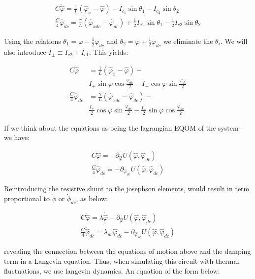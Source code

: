 \documentclass[paper=a4, twocolumn, fontsize=10pt]{article} %
\numberwithin{equation}{section} %
\numberwithin{figure}{section} %
\numberwithin{table}{section} %
\def \df#1{\hat{#1}}
\begin{document}
\begin{align}
    C \ddot{\df\varphi} = \frac{1}{L}\left( \df\varphi_x - \df\varphi \right) - I_{c_1} \sin \theta_1 - I_{c_2} \sin \theta_2
    \\
    \frac{C}{4} \ddot{\df\varphi}_{dc}= \frac{\gamma}{L}\left( \df\varphi_{xdc} -\df\varphi_{dc}\right) +\frac{1}{2}I_{c1} \sin\theta_1 - \frac{1}{2} I_{c2} \sin \theta_2
    \end{align}


Using the relations $\theta_1 = \varphi - \frac{1}{2}\varphi_{dc} $ and $\theta_2 = \varphi + \frac{1}{2}\varphi_{dc} $ we eliminate the $\theta_i$. We will also introduce $I_{\pm} \equiv I_{c2} \pm I_{c1}$.  This yields:

\begin{align}
    C \ddot{\df\varphi} &= \frac{1}{L}\left( \df\varphi_x - \df\varphi \right) - 
    \\
    &I_{+} \sin \varphi \cos \frac{\varphi_{dc}}{2} - I_{-} \cos \varphi \sin \frac{\varphi_{dc}}{2}
    \\
    \frac{C}{4} \ddot{\df\varphi}_{dc} &= \frac{\gamma}{L}\left( \df\varphi_{xdc} -\df\varphi_{dc}\right) - 
    \\
    &\frac{I_{+}}{2} \cos \varphi \sin \frac{\varphi_{dc}}{2} - \frac{I_{-}}{2} \sin \varphi \cos \frac{\varphi_{dc}}{2}
\end{align}

If we think about the equations as being the lagrangian EQOM of the system-- we have:

\begin{align}
C \ddot{\df\varphi} =- \partial_{\df\varphi} U(\df\varphi, \df\varphi_{dc})
\\
\frac{C}{4} \ddot{\df\varphi}_{dc} =  - \partial_{\df\varphi_{dc}} U(\df\varphi, \df\varphi_{dc})
\end{align}


Reintroducing the resistive shunt to the josephson elements, would result in term proportional to $\dot{\phi}$ or $\dot{\phi}_{dc}$, as below:

\begin{align}
C \ddot{\df\varphi} = \lambda \dot{\df\varphi} - \partial_{\df\varphi} U(\df\varphi, \df\varphi_{dc})
\\
\frac{C}{4} \ddot{\df\varphi}_{dc} = \lambda_{dc} \dot{\df\varphi}_{dc} - \partial_{\df\varphi_{dc}} U(\df\varphi, \df\varphi_{dc})
\end{align}

revealing the connection between the equations of motion above and the damping term in a Langevin equation. Thus, when simulating this circuit with thermal fluctuations, we use langevin dynamics. An equation of the form below:
\end{document}
